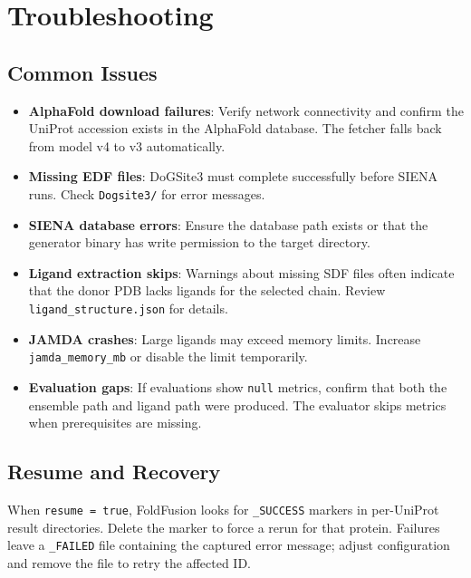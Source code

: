 \documentclass[11pt]{article}
\begin{document}
\section{Troubleshooting}
\subsection{Common Issues}
\begin{itemize}[noitemsep]
      \item \textbf{AlphaFold download failures}: Verify network connectivity and
            confirm the UniProt accession exists in the AlphaFold database. The
            fetcher falls back from model v4 to v3 automatically.
      \item \textbf{Missing EDF files}: DoGSite3 must complete successfully before
            SIENA runs. Check \texttt{Dogsite3/} for error messages.
      \item \textbf{SIENA database errors}: Ensure the database path exists or that
            the generator binary has write permission to the target directory.
      \item \textbf{Ligand extraction skips}: Warnings about missing SDF files often
            indicate that the donor PDB lacks ligands for the selected chain. Review
            \texttt{ligand\_structure.json} for details.
      \item \textbf{JAMDA crashes}: Large ligands may exceed memory limits. Increase
            \texttt{jamda\_memory\_mb} or disable the limit temporarily.
      \item \textbf{Evaluation gaps}: If evaluations show \texttt{null} metrics,
            confirm that both the ensemble path and ligand path were produced. The
            evaluator skips metrics when prerequisites are missing.
\end{itemize}

\subsection{Resume and Recovery}
When \texttt{resume = true}, FoldFusion looks for \texttt{\_SUCCESS} markers in
per-UniProt result directories. Delete the marker to force a rerun for that
protein. Failures leave a \texttt{\_FAILED} file containing the captured error
message; adjust configuration and remove the file to retry the affected ID.
\end{document}
